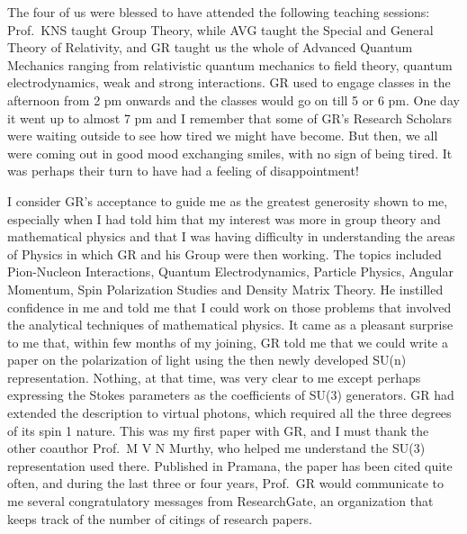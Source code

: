 The four of us were blessed to have attended the following teaching sessions: Prof.\ KNS taught Group Theory, while AVG taught the Special and General Theory of Relativity, and GR taught us the whole of Advanced Quantum Mechanics ranging from relativistic quantum mechanics to field theory, quantum electrodynamics, weak and strong interactions. GR used to engage classes in the afternoon from 2 pm onwards and the classes would go on till 5 or 6 pm. One day it went up to almost 7 pm and I remember that some of GR's Research Scholars were waiting outside to see how tired we might have become. But then, we all were coming out in good mood exchanging smiles, with no sign of being tired. It was perhaps their turn to have had a feeling of disappointment!

I consider GR's acceptance to guide me as the greatest generosity shown to me, especially when I had told him that my interest was more in group theory and mathematical physics and that I was having difficulty in understanding the areas of Physics in which GR and his Group were then working. The topics included Pion-Nucleon Interactions, Quantum Electrodynamics, Particle Physics, Angular Momentum, Spin Polarization Studies and Density Matrix Theory. He instilled confidence in me and told me that I could work on those problems that involved the analytical techniques of mathematical physics. It came as a pleasant surprise to me that, within few months of my joining, GR told me that we could write a paper on the polarization of light using the then newly developed SU(n) representation. Nothing, at that time, was very clear to me except perhaps expressing the Stokes parameters as the coefficients of SU(3) generators. GR had extended the description to virtual photons, which required all the three degrees of its spin 1 nature. This was my first paper with GR, and I must thank the other coauthor Prof.\ M V N Murthy, who helped me understand the SU(3) representation used there. Published in Pramana, the paper has been cited quite often, and during the last three or four years, Prof.\ GR would communicate to me several congratulatory messages from ResearchGate, an organization that keeps track of the number of citings of research papers.

